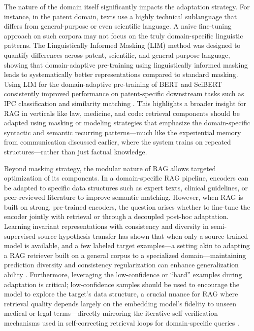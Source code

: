 \documentclass[11pt]{article}
\begin{document}
The nature of the domain itself significantly impacts the adaptation strategy. For instance, in the patent domain, texts use a highly technical sublanguage that differs from general-purpose or even scientific language. A naive fine-tuning approach on such corpora may not focus on the truly domain-specific linguistic patterns. The Linguistically Informed Masking (LIM) method was designed to quantify differences across patent, scientific, and general-purpose language, showing that domain-adaptive pre-training using linguistically informed masking leads to systematically better representations compared to standard masking. Using LIM for the domain-adaptive pre-training of BERT and SciBERT consistently improved performance on patent-specific downstream tasks such as IPC classification and similarity matching \cite{ref111}. This highlights a broader insight for RAG in verticals like law, medicine, and code: retrieval components should be adapted using masking or modeling strategies that emphasize the domain-specific syntactic and semantic recurring patterns---much like the experiential memory from communication discussed earlier, where the system trains on repeated structures---rather than just factual knowledge.

Beyond masking strategy, the modular nature of RAG allows targeted optimization of its components. In a domain-specific RAG pipeline, encoders can be adapted to specific data structures such as expert texts, clinical guidelines, or peer-reviewed literature to improve semantic matching. However, when RAG is built on strong, pre-trained encoders, the question arises whether to fine-tune the encoder jointly with retrieval or through a decoupled post-hoc adaptation. Learning invariant representations with consistency and diversity in semi-supervised source hypothesis transfer has shown that when only a source-trained model is available, and a few labeled target examples---a setting akin to adapting a RAG retriever built on a general corpus to a specialized domain---maintaining prediction diversity and consistency regularization can enhance generalization ability \cite{ref112}. Furthermore, leveraging the low-confidence or ``hard'' examples during adaptation is critical; low-confidence samples should be used to encourage the model to explore the target's data structure, a crucial nuance for RAG where retrieval quality depends largely on the embedding model's fidelity to unseen medical or legal terms---directly mirroring the iterative self-verification mechanisms used in self-correcting retrieval loops for domain-specific queries \cite{ref113}.
\end{document}
